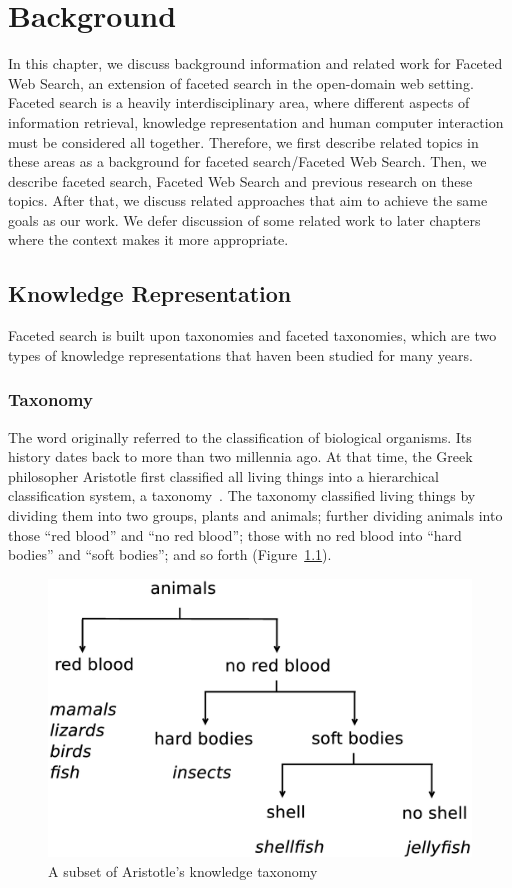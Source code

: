 \chapter{Background}
\label{ch:bg}
In this chapter, we discuss background information and related work for Faceted Web Search, an extension of faceted search in the open-domain web setting. Faceted search is a heavily interdisciplinary area, where different aspects of information retrieval, knowledge representation and human computer interaction must be considered all together. Therefore, we first describe related topics in these areas as a background for faceted search/Faceted Web Search. Then, we describe faceted search, Faceted Web Search and previous research on these topics. After that, we discuss related approaches that aim to achieve the same goals as our work. We defer discussion of some related work to later chapters where the context makes it more appropriate.

\section{Knowledge Representation}
Faceted search is built upon taxonomies and faceted taxonomies, which are two types of knowledge representations that haven been studied for many years.

\subsection{Taxonomy}
\label{sec:bg-taxonomy}
The word  originally referred to the classification of biological organisms. Its history dates back to more than two millennia ago. At that time, the Greek philosopher Aristotle first classified all living things into a hierarchical classification system, a taxonomy~\cite{tunkelang2009faceted}. The taxonomy classified living things by dividing them into two groups, plants and animals; further dividing animals into those ``red blood'' and ``no red blood''; those with no red blood into ``hard bodies'' and ``soft bodies''; and so forth (Figure~\ref{fig:bg-aristotle}).
\begin{figure}[!ht]
\centering
\includegraphics[width=0.8\columnwidth]{drawing/aristotle.eps}
\caption{A subset of Aristotle's knowledge taxonomy~\cite{tunkelang2009faceted}}
\label{fig:bg-aristotle}
\end{figure}

